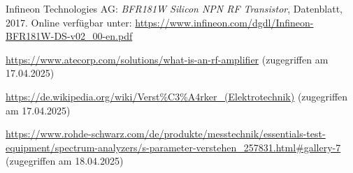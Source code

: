 \begin{thebibliography}{1}
Infineon Technologies AG: \emph{BFR181W Silicon NPN RF Transistor}, Datenblatt, 2017. Online verfügbar unter: \url{https://www.infineon.com/dgdl/Infineon-BFR181W-DS-v02_00-en.pdf}

\url{https://www.atecorp.com/solutions/what-is-an-rf-amplifier} (zugegriffen am 17.04.2025)

\url{https://de.wikipedia.org/wiki/Verst%C3%A4rker_(Elektrotechnik)} (zugegriffen am 17.04.2025)

\url{https://www.rohde-schwarz.com/de/produkte/messtechnik/essentials-test-equipment/spectrum-analyzers/s-parameter-verstehen_257831.html#gallery-7} (zugegriffen am 18.04.2025)
\end{thebibliography}
%
\clearpage